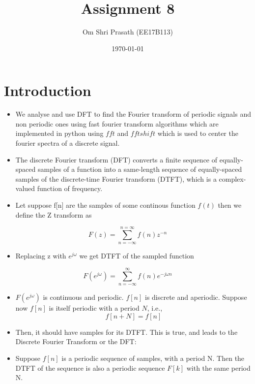 \documentclass[11pt, a4paper]{article}
\title{Assignment 8} %
\author{Om Shri Prasath (EE17B113)} %
\date{\today} %
\begin{document}
	

\maketitle %
\section{Introduction}\label{introduction}

\begin{itemize}

\item
  We analyse and use DFT to find the Fourier transform of
  periodic signals and non periodic ones using fast fourier transform
  algorithms which are implemented in python using \(fft\) and
  \(fftshift\) which is used to center the fourier spectra of a discrete
  signal.
\item
  The discrete Fourier transform (DFT) converts a finite sequence of
  equally-spaced samples of a function into a same-length sequence of
  equally-spaced samples of the discrete-time Fourier transform (DTFT),
  which is a complex-valued function of frequency.
\item
  Let suppose f{[}n{]} are the samples of some continous function
  \(f(t)\) then we define the Z transform as
\end{itemize}

\begin{equation}
F(z) = \sum_{n = -\infty}^{n = \infty} f(n)z^{-n}
\end{equation}

\begin{itemize}

\item
  Replacing z with \(e^{j\omega}\) we get DTFT of the sampled function
\end{itemize}

\begin{equation}
F(e^{j\omega}) = \sum_{n = -\infty}^{\infty} f(n)e^{-j\omega n}
\end{equation}

\begin{itemize}
\item
  \(F(e^{j\omega})\) is continuous and periodic. \(f[n]\) is discrete
  and aperiodic. Suppose now \(f[n]\) is itself periodic with a period
  \(N\), i.e., \[ f[n+N] = f[n] \]
\item
  Then, it should have samples for its DTFT. This is true, and leads to
  the Discrete Fourier Transform or the DFT:
\item
  Suppose \(f[n]\) is a periodic sequence of samples, with a period N.
  Then the DTFT of the sequence is also a periodic sequence \(F[k]\)
  with the same period N.
\end{itemize}
\end{document}
